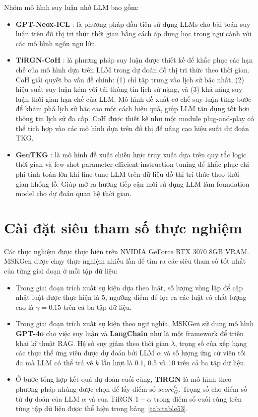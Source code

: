 Nhóm mô hình suy luận nhờ LLM bao gồm:
\begin{itemize}
    \item \textbf{GPT-Neox-ICL} \cite{ref_article08}: là phương pháp đầu tiên sử dụng LLMs cho bài toán suy luận trên đồ thị tri thức thời gian bằng cách áp dụng học trong ngữ cảnh với các mô hình ngôn ngữ lớn.
    \item \textbf{TiRGN-CoH} \cite{ref_article09}: là phương pháp suy luận được thiết kế để khắc phục các hạn chế của mô hình dựa trên LLM trong dự đoán đồ thị tri thức theo thời gian. CoH giải quyết ba vấn đề chính: (1) chỉ tập trung vào lịch sử bậc nhất, (2) hiệu suất suy luận kém với tải thông tin lịch sử nặng, và (3) khả năng suy luận thời gian hạn chế của LLM. Mô hình đề xuất cơ chế suy luận từng bước để khám phá lịch sử bậc cao một cách hiệu quả, giúp LLM tận dụng tốt hơn thông tin lịch sử đa cấp. CoH được thiết kế như một module plug-and-play có thể tích hợp vào các mô hình dựa trên đồ thị để nâng cao hiệu suất dự đoán TKG.
    \item \textbf{GenTKG} \cite{ref_article10}: là mô hình đề xuất chiến lược truy xuất dựa trên quy tắc logic thời gian và few-shot parameter-efficient instruction tuning để khắc phục chi phí tính toán lớn khi fine-tune LLM trên dữ liệu đồ thị tri thức theo thời gian khổng lồ. Giúp mở ra hướng tiếp cận mới sử dụng LLM làm foundation model cho dự đoán quan hệ thời gian.
\end{itemize}

\section{Cài đặt siêu tham số thực nghiệm}
Các thực nghiệm được thực hiện trên NVIDIA GeForce RTX 3070 8GB VRAM. MSKGen được chạy thực nghiệm nhiều lần để tìm ra các siêu tham số
tốt nhất của từng giai đoạn ở mỗi tập dữ liệu:
\begin{itemize}
    \item Trong giai đoạn trích xuất sự kiện dựa theo luật, số lượng vòng lặp để cập nhật luật được thực hiện là 5, 
ngưỡng điểm để lọc ra các luật có chất lượng cao là $\gamma = 0.15$ trên cả ba tập dữ liệu.
    \item Trong giai đoạn trích xuất sự kiện theo ngữ nghĩa, MSKGen sử dụng mô hình \textbf{GPT-4o} cho việc suy luận và
    \textbf{LangChain} \cite{ref_article37} như là một framework để triên khai kĩ thuật RAG.  
    Hệ số suy giảm theo thời gian $\lambda$, trọng số của xếp hạng các thực thể ứng viên được dự đoán bởi LLM $\alpha$ và
    số lượng ứng cử viên tối đa mà LLM có thể trả về $k$ lần lượt là 0.1, 0.5 và 10 trên cả ba tập dữ liệu. 
    \item Ở bước tổng hợp kết quả dự đoán cuối cùng, \textbf{TiRGN} là mô hình theo phương pháp nhúng được chọn để lấy điểm số $score_{G}^{c_i}$. 
    Trọng số cho điểm số từ dự đoán của LLM $\alpha$ và của TiRGN $1 - \alpha$
    trong điểm số cuối cùng trên từng tập dữ liệu được thể hiện trong bảng~\ref{tab:table53}.
\end{itemize}

